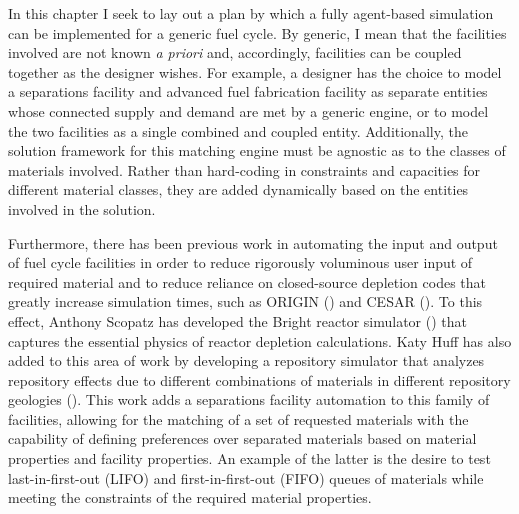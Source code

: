 In this chapter I seek to lay out a plan by which a fully agent-based simulation
can be implemented for a generic fuel cycle. By generic, I mean that the
facilities involved are not known \textit{a priori} and, accordingly,
facilities can be coupled together as the designer wishes. For example, a
designer has the choice to model a separations facility and advanced fuel
fabrication facility as separate entities whose connected supply and demand are
met by a generic engine, or to model the two facilities as a single combined and
coupled entity. Additionally, the solution framework for this matching engine
must be agnostic as to the classes of materials involved. Rather than
hard-coding in constraints and capacities for different material classes, they
are added dynamically based on the entities involved in the solution.

Furthermore, there has been previous work in automating the input and output of
fuel cycle facilities in order to reduce rigorously voluminous user input of
required material and to reduce reliance on closed-source depletion codes that
greatly increase simulation times, such as ORIGIN (\cite{bell_origen_1973}) and
CESAR (\cite{vidal_cesar:_2006}). To this effect, Anthony Scopatz has developed
the Bright reactor simulator (\cite{scopatz_essential_2011}) that captures the
essential physics of reactor depletion calculations. Katy Huff has also added to
this area of work by developing a repository simulator that analyzes repository
effects due to different combinations of materials in different repository
geologies (\cite{huff_benchmarking_2012}). This work adds a separations facility
automation to this family of facilities, allowing for the matching of a set of
requested materials with the capability of defining preferences over separated
materials based on material properties and facility properties. An example of
the latter is the desire to test last-in-first-out (LIFO) and first-in-first-out
(FIFO) queues of materials while meeting the constraints of the required
material properties.

